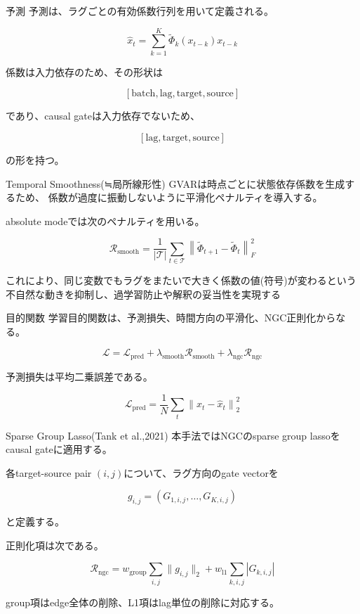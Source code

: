 \documentclass[dvipdfmx,11pt]{beamer}
\begin{document}
\begin{frame}{予測}
  予測は、ラグごとの有効係数行列を用いて定義される。

  \[
    \hat{x}_t =
    \sum_{k=1}^{K}
    \tilde{\Phi}_k(x_{t-k}) x_{t-k}
  \]

  \vspace{0.5em}
  係数は入力依存のため、その形状は

  \[
    [\text{batch}, \text{lag}, \text{target}, \text{source}]
  \]

  であり、causal gateは入力依存でないため、

  \[
    [\text{lag}, \text{target}, \text{source}]
  \]

  の形を持つ。
\end{frame}

\begin{frame}{Temporal Smoothness(≒局所線形性)}
  GVARは時点ごとに状態依存係数を生成するため、
  係数が過度に振動しないように平滑化ペナルティを導入する。

  absolute modeでは次のペナルティを用いる。

  \[
    \mathcal{R}_{\mathrm{smooth}}
    =
    \frac{1}{|\mathcal{T}|}
    \sum_{t \in \mathcal{T}}
    \left\|
      \tilde{\Phi}_{t+1}
      -
      \tilde{\Phi}_t
    \right\|_F^2
  \]

 これにより、同じ変数でもラグをまたいで大きく係数の値(符号)が変わるという
 不自然な動きを抑制し、過学習防止や解釈の妥当性を実現する
\end{frame}

\begin{frame}{目的関数}
  学習目的関数は、予測損失、時間方向の平滑化、NGC正則化からなる。

  \[
    \mathcal{L}
    =
    \mathcal{L}_{\mathrm{pred}}
    +
    \lambda_{\mathrm{smooth}}
    \mathcal{R}_{\mathrm{smooth}}
    +
    \lambda_{\mathrm{ngc}}
    \mathcal{R}_{\mathrm{ngc}}
  \]

  予測損失は平均二乗誤差である。

  \[
    \mathcal{L}_{\mathrm{pred}}
    =
    \frac{1}{N}
    \sum_t
    \left\|
      x_t - \hat{x}_t
    \right\|_2^2
  \]

\end{frame}

\begin{frame}{Sparse Group Lasso(Tank et al.,2021)}
  本手法ではNGCのsparse group lassoをcausal gateに適用する。

  各target-source pair $(i,j)$について、ラグ方向のgate vectorを

  \[
    g_{i,j}
    =
    (G_{1,i,j}, \dots, G_{K,i,j})
  \]

  と定義する。

  正則化項は次である。

  \[
    \mathcal{R}_{\mathrm{ngc}}
    =
    w_{\mathrm{group}}
    \sum_{i,j}
    \|g_{i,j}\|_2
    +
    w_{\mathrm{l1}}
    \sum_{k,i,j}
    |G_{k,i,j}|
  \]

  group項はedge全体の削除、L1項はlag単位の削除に対応する。
\end{frame}
\end{document}
